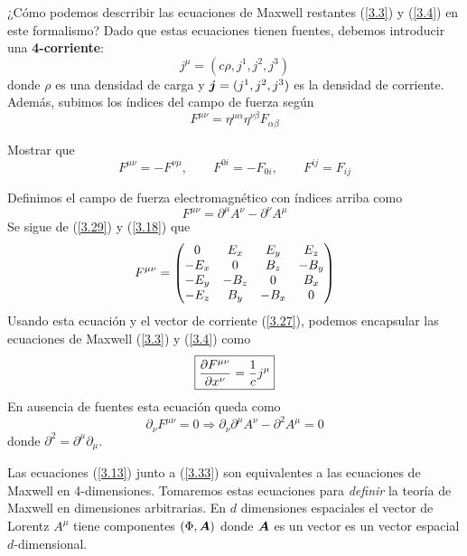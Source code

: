 ¿Cómo podemos descrribir las ecuaciones de Maxwell restantes (\ref{3.3}) y (\ref{3.4}) en este formalismo? Dado que estas ecuaciones tienen fuentes, debemos introducir una \textbf{4-corriente}:
\begin{equation}\label{3.27}
    j^\mu=(c\rho,j^1,j^2,j^3)
\end{equation}
donde $\rho$ es una densidad de carga y $\vb*{j}=(j^1,j^2,j^3)$ es la densidad de corriente. Además, subimos los índices del campo de fuerza según
\begin{equation}\label{3.28}
    F^{\mu\nu}=\eta^{\mu\alpha}\eta^{\nu\beta}F_{\alpha\beta}
\end{equation}
\begin{tcolorbox}
    Mostrar que 
    \begin{equation}\label{3.29}
        F^{\mu\nu}=-F^{\nu\mu},\qquad F^{0i}=-F_{0i},\qquad F^{ij}=F_{ij}
    \end{equation}
\end{tcolorbox}
Definimos el campo de fuerza electromagnético con índices arriba como
\begin{equation}\label{3.31}
    F^{\mu\nu}=\partial^\mu A^\nu - \partial^\nu A^\mu
\end{equation}
Se sigue de (\ref{3.29}) y (\ref{3.18}) que
\begin{equation}\label{3.32}
    F^{\mu\nu}=\mqty(0&E_x&E_y&E_z\\-E_x&0&B_z&-B_y\\-E_y&-B_z&0&B_x\\-E_z&B_y&-B_x&0)
\end{equation}
Usando esta ecuación y el vector de corriente (\ref{3.27}), podemos encapsular las ecuaciones de Maxwell (\ref{3.3}) y (\ref{3.4}) como
\begin{equation}\label{3.33}
    \boxed{\pdv{F^{\mu\nu}}{x^\nu}=\frac{1}{c}j^\mu}
\end{equation}
En ausencia de fuentes esta ecuación queda como
\begin{equation}\label{3.34}
    \partial_\nu F^{\mu\nu}=0\Rightarrow \partial_\nu\partial^\mu A^\nu-\partial^2 A^\mu=0
\end{equation}
donde $\partial^2=\partial^\mu\partial_\mu$.

Las ecuaciones (\ref{3.13}) junto a (\ref{3.33}) son equivalentes a las ecuaciones de Maxwell en 4-dimensiones. Tomaremos estas ecuaciones para \textit{definir} la teoría de Maxwell en dimensiones arbitrarias. En $d$ dimensiones espaciales el vector de Lorentz $A^\mu$ tiene componentes $(\Phi,\vb*{A})$ donde $\vb*{A}$ es un vector es un vector espacial $d$-dimensional.

